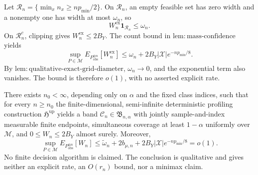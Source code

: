 Let \(\mathcal R_n=\{\min_xn_x\ge np_{\min}/2\}\).  On \(\mathcal R_n\), an empty feasible set has zero width and a nonempty one has width at most \(\omega_n\), so
\[
 W_n^{\mathrm{ex}}\mathbf1_{\mathcal R_n}\le\omega_n.
\]
On \(\mathcal R_n^c\), clipping gives \(W_n^{\mathrm{ex}}\le2B_Y\).  The count bound in \(\mathrm{lem{:}mass\text{-}confidence}\) yields
\[
 \sup_{P\in\mathcal M}E_{P_{\mathrm{obs}}^{\otimes n}}[W_n^{\mathrm{ex}}]
 \le\omega_n+2B_Y|\mathcal X|e^{-np_{\min}/8}.
\]
By \(\mathrm{lem{:}qualitative\text{-}exact\text{-}grid\text{-}diameter}\), \(\omega_n\to0\), and the exponential term also vanishes.  The bound is therefore \(o(1)\), with no asserted explicit rate.

There exists \(n_0<\infty\), depending only on \(\alpha\) and the fixed class indices, such that for every \(n\ge n_0\) the finite-dimensional, semi-infinite deterministic profiling construction \(\mathfrak H^{\mathrm{up}}\) yields a band \(\mathcal C_n\in\mathfrak B_{n,\alpha}\) with jointly sample-and-index measurable finite endpoints, simultaneous coverage at least \(1-\alpha\) uniformly over \(\mathcal M\), and \(0\le W_n\le2B_Y\) almost surely. Moreover,
\[
 \sup_{P\in\mathcal M}E_{P_{\mathrm{obs}}^{\otimes n}}[W_n]
 \le \widetilde\omega_n+2b_{\mu,n}
   +2B_Y|\mathcal X|e^{-np_{\min}/8}=o(1).
\]
No finite decision algorithm is claimed. The conclusion is qualitative and gives neither an explicit rate, an \(O(r_n)\) bound, nor a minimax claim.

